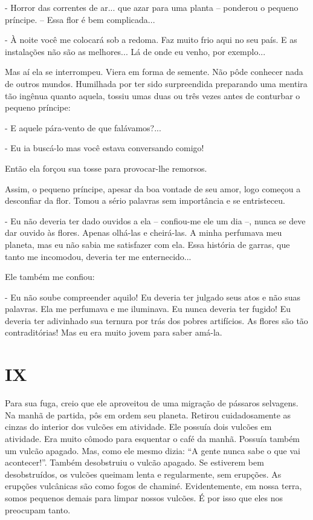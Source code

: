 - Horror das correntes de ar... que azar para uma planta -- ponderou o
pequeno príncipe. -- Essa flor é bem complicada...

- À noite você me colocará sob a redoma. Faz muito frio aqui no seu
país. E as instalações não são as melhores... Lá de onde eu venho, por
exemplo...

Mas aí ela se interrompeu. Viera em forma de semente. Não pôde conhecer
nada de outros mundos. Humilhada por ter sido surpreendida preparando
uma mentira tão ingênua quanto aquela, tossiu umas duas ou três vezes
antes de conturbar o pequeno príncipe:

- E aquele pára-vento de que falávamos?...

- Eu ia buscá-lo mas você estava conversando comigo!

Então ela forçou sua tosse para provocar-lhe remorsos.

Assim, o pequeno príncipe, apesar da boa vontade de seu amor, logo
começou a desconfiar da flor. Tomou a sério palavras sem importância e
se entristeceu.

- Eu não deveria ter dado ouvidos a ela -- confiou-me ele um dia --,
nunca se deve dar ouvido às flores. Apenas olhá-las e cheirá-las. A
minha perfumava meu planeta, mas eu não sabia me satisfazer com ela.
Essa história de garras, que tanto me incomodou, deveria ter me
enternecido...

Ele também me confiou:

- Eu não soube compreender aquilo! Eu deveria ter julgado seus atos e
não suas palavras. Ela me perfumava e me iluminava. Eu nunca deveria ter
fugido! Eu deveria ter adivinhado sua ternura por trás dos pobres
artifícios. As flores são tão contraditórias! Mas eu era muito jovem
para saber amá-la.

\chapter{IX}

Para sua fuga, creio que ele aproveitou de uma migração de pássaros
selvagens. Na manhã de partida, pôs em ordem seu planeta. Retirou
cuidadosamente as cinzas do interior dos vulcões em atividade. Ele
possuía dois vulcões em atividade. Era muito cômodo para esquentar o
café da manhã. Possuía também um vulcão apagado. Mas, como ele mesmo
dizia: ``A gente nunca sabe o que vai acontecer!''. Também desobstruiu o
vulcão apagado. Se estiverem bem desobstruídos, os vulcões queimam lenta
e regularmente, sem erupções. As erupções vulcânicas são como fogos de
chaminé. Evidentemente, em nossa terra, somos pequenos demais para
limpar nossos vulcões. É por isso que eles nos preocupam tanto.

